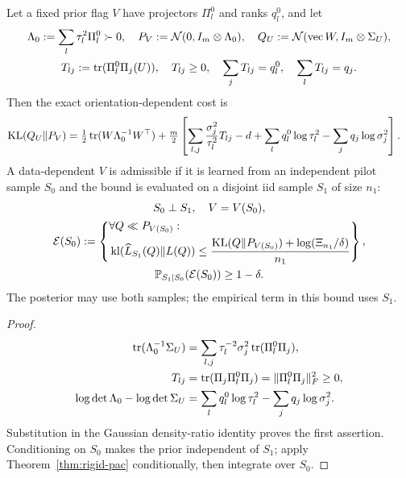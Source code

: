 \begin{proposition}
\label{prop:directional-prior}
Let a fixed prior flag $V$ have projectors $\Pi_l^0$ and ranks $q_l^0$, and let
\begin{gather}
 \Lambda_0:=\sum_l\tau_l^2\Pi_l^0\succ0,\quad
 P_V:=\mathcal N(0,I_m\otimes\Lambda_0),\quad
 Q_U:=\mathcal N(\operatorname{vec}W,I_m\otimes\Sigma_U),\\
 T_{lj}:=\operatorname{tr}(\Pi_l^0\Pi_j(U)),\quad T_{lj}\ge0,\quad
 \sum_jT_{lj}=q_l^0,\quad\sum_lT_{lj}=q_j.
\end{gather}
Then the exact orientation-dependent cost is
\begin{align}
 \operatorname{KL}(Q_U\|P_V)
 &=\tfrac12\operatorname{tr}(W\Lambda_0^{-1}W^\top)
 +\tfrac m2\left[\sum_{l,j}\frac{\sigma_j^2}{\tau_l^2}T_{lj}-d
 +\sum_lq_l^0\log\tau_l^2-\sum_jq_j\log\sigma_j^2\right].
\end{align}
A data-dependent $V$ is admissible if it is learned from an independent pilot
sample $S_0$ and the bound is evaluated on a disjoint iid sample $S_1$ of size $n_1$:
\begin{gather}
 S_0\perp S_1,\quad V=V(S_0),\\
 \mathcal E(S_0):=\left\{\begin{aligned}
 &\forall Q\ll P_{V(S_0)}:\\
 &\operatorname{kl}(\widehat L_{S_1}(Q)\|L(Q))
 \le\frac{\operatorname{KL}(Q\|P_{V(S_0)})+\log(\Xi_{n_1}/\delta)}{n_1}
 \end{aligned}\right\},\\
 \mathbb P_{S_1\mid S_0}(\mathcal E(S_0))\ge1-\delta.
\end{gather}
The posterior may use both samples; the empirical term in this bound uses $S_1$.
\end{proposition}
\begin{proof}
\begin{align}
 \operatorname{tr}(\Lambda_0^{-1}\Sigma_U)
 &=\sum_{l,j}\tau_l^{-2}\sigma_j^2\operatorname{tr}(\Pi_l^0\Pi_j),\\
 T_{lj}&=\operatorname{tr}(\Pi_j\Pi_l^0\Pi_j)=\|\Pi_l^0\Pi_j\|_F^2\ge0,\\
 \log\det\Lambda_0-\log\det\Sigma_U
 &=\sum_lq_l^0\log\tau_l^2-\sum_jq_j\log\sigma_j^2.
\end{align}
Substitution in the Gaussian density-ratio identity proves the first assertion.
Conditioning on $S_0$ makes the prior independent of $S_1$; apply
Theorem~\ref{thm:rigid-pac} conditionally, then integrate over $S_0$.
\end{proof}
